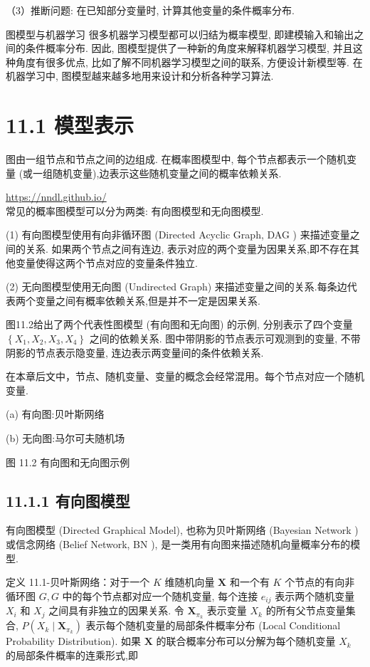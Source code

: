 \documentclass[10pt]{article}
\begin{document}
（3）推断问题: 在已知部分变量时, 计算其他变量的条件概率分布.

图模型与机器学习 很多机器学习模型都可以归结为概率模型, 即建模输入和输出之间的条件概率分布. 因此, 图模型提供了一种新的角度来解释机器学习模型, 并且这种角度有很多优点, 比如了解不同机器学习模型之间的联系, 方便设计新模型等. 在机器学习中, 图模型越来越多地用来设计和分析各种学习算法.

\section*{11.1 模型表示}
图由一组节点和节点之间的边组成. 在概率图模型中, 每个节点都表示一个随机变量 (或一组随机变量),边表示这些随机变量之间的概率依赖关系.

\href{https://nndl.github.io/}{https://nndl.github.io/}\\
常见的概率图模型可以分为两类: 有向图模型和无向图模型.

(1) 有向图模型使用有向非循环图 (Directed Acyclic Graph, DAG ) 来描述变量之间的关系. 如果两个节点之间有连边, 表示对应的两个变量为因果关系,即不存在其他变量使得这两个节点对应的变量条件独立.

(2) 无向图模型使用无向图 (Undirected Graph) 来描述变量之间的关系.每条边代表两个变量之间有概率依赖关系,但是并不一定是因果关系.

图11.2给出了两个代表性图模型 (有向图和无向图) 的示例, 分别表示了四个变量 $\left\{X_{1}, X_{2}, X_{3}, X_{4}\right\}$ 之间的依赖关系. 图中带阴影的节点表示可观测到的变量, 不带阴影的节点表示隐变量, 连边表示两变量间的条件依赖关系.

在本章后文中，节点、随机变量、变量的概念会经常混用。每个节点对应一个随机变量.



(a) 有向图:贝叶斯网络



(b) 无向图:马尔可夫随机场

图 11.2 有向图和无向图示例

\subsection*{11.1.1 有向图模型}
有向图模型 (Directed Graphical Model), 也称为贝叶斯网络 (Bayesian Network ) 或信念网络 (Belief Network, BN ), 是一类用有向图来描述随机向量概率分布的模型.

定义 11.1-贝叶斯网络：对于一个 $K$ 维随机向量 $\boldsymbol{X}$ 和一个有 $K$ 个节点的有向非循环图 $G, G$ 中的每个节点都对应一个随机变量, 每个连接 $e_{i j}$ 表示两个随机变量 $X_{i}$ 和 $X_{j}$ 之间具有非独立的因果关系. 令 $\boldsymbol{X}_{\pi_{k}}$ 表示变量 $X_{k}$ 的所有父节点变量集合, $P\left(X_{k} \mid \boldsymbol{X}_{\pi_{k}}\right)$ 表示每个随机变量的局部条件概率分布 (Local Conditional Probability Distribution). 如果 $\boldsymbol{X}$ 的联合概率分布可以分解为每个随机变量 $X_{k}$ 的局部条件概率的连乘形式,即
\end{document}
